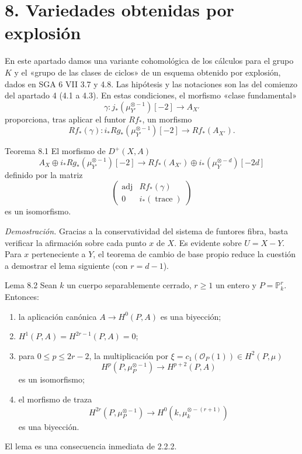 \section*{8. Variedades obtenidas por explosión}

En este apartado damos una variante cohomológica de los cálculos para el grupo $K$ y el «grupo de las clases de ciclos» de un esquema obtenido por explosión, dados en SGA 6 VII 3.7 y 4.8. Las hipótesis y las notaciones son las del comienzo del apartado 4 (4.1 a 4.3). En estas condiciones, el morfismo «clase fundamental»
\[
\gamma:j_*(\mu_{Y'}^{\otimes -1})[-2]\to A_{X'}
\]
proporciona, tras aplicar el funtor $Rf_*$, un morfismo
\[
Rf_*(\gamma):i_*Rg_*(\mu_{Y'}^{\otimes -1})[-2]\to Rf_*(A_{X'}).
\]

\begin{statement}{Teorema 8.1}
El morfismo de $D^+(X,A)$
\[
A_X\oplus i_*Rg_*(\mu_{Y'}^{\otimes -1})[-2]\to
Rf_*(A_{X'})\oplus i_*(\mu_Y^{\otimes -d})[-2d]
\tag{8.1.1}
\]
definido por la matriz
\[
\begin{pmatrix}
\operatorname{adj}&Rf_*(\gamma)\\
0&i_*(\operatorname{trace})
\end{pmatrix}
\]
es un isomorfismo.
\end{statement}

\emph{Demostración.} Gracias a la conservatividad del sistema de funtores fibra, basta verificar la afirmación sobre cada punto $x$ de $X$. Es evidente sobre $U=X-Y$. Para $x$ perteneciente a $Y$, el teorema de cambio de base propio reduce la cuestión a demostrar el lema siguiente (con $r=d-1$).

\begin{statement}{Lema 8.2}
Sean $k$ un cuerpo separablemente cerrado, $r\ge1$ un entero y $P=\mathbb P_k^r$. Entonces:
\begin{enumerate}[label=\alph*)]
\item la aplicación canónica $A\to H^0(P,A)$ es una biyección;
\item $H^1(P,A)=H^{2r-1}(P,A)=0$;
\item para $0\le p\le2r-2$, la multiplicación por $\xi=c_1(\mathcal O_P(1))\in H^2(P,\mu)$
\[
H^p(P,\mu_P^{\otimes -1})\to H^{p+2}(P,A)
\]
es un isomorfismo;
\item el morfismo de traza
\[
H^{2r}(P,\mu_P^{\otimes -1})\to H^0(k,\mu_k^{\otimes -(r+1)})
\]
es una biyección.
\end{enumerate}
\end{statement}

El lema es una consecuencia inmediata de 2.2.2.
